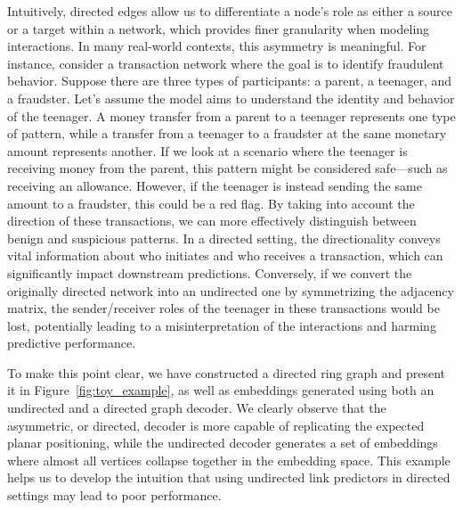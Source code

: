\documentclass{article}
\begin{document}
Intuitively, directed edges allow us to differentiate a node's role as either a source or a target within a network, which provides finer granularity when modeling interactions. In many real-world contexts, this asymmetry is meaningful. For instance, consider a transaction network where the goal is to identify fraudulent behavior. Suppose there are three types of participants: a parent, a teenager, and a fraudster. Let’s assume the model aims to understand the identity and behavior of the teenager. A money transfer from a parent to a teenager represents one type of pattern, while a transfer from a teenager to a fraudster at the same monetary amount represents another. If we look at a scenario where the teenager is receiving money from the parent, this pattern might be considered safe—such as receiving an allowance. However, if the teenager is instead sending the same amount to a fraudster, this could be a red flag. By taking into account the direction of these transactions, we can more effectively distinguish between benign and suspicious patterns. In a directed setting, the directionality conveys vital information about who initiates and who receives a transaction, which can significantly impact downstream predictions. Conversely, if we convert the originally directed network into an undirected one by symmetrizing the adjacency matrix, the sender/receiver roles of the teenager in these transactions would be lost, potentially leading to a misinterpretation of the interactions and harming predictive performance. 

To make this point clear, we have constructed a directed ring graph and present it in Figure~\ref{fig:toy_example}, as well as embeddings generated using both an undirected and a directed graph decoder. We clearly observe that the asymmetric, or directed, decoder is more capable of replicating the expected planar positioning, while the undirected decoder generates a set of embeddings where almost all vertices collapse together in the embedding space. This example helps us to develop the intuition that using undirected link predictors in directed settings may lead to poor performance.
\end{document}
